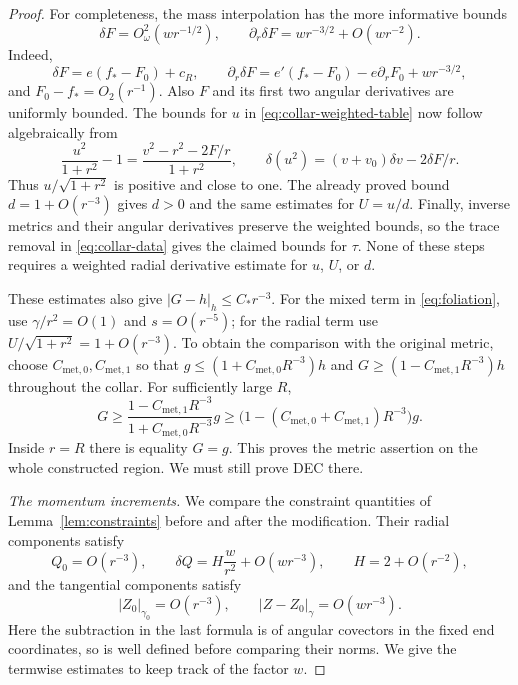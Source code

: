 \begin{proof}
For completeness, the mass interpolation has the more informative
bounds
\begin{equation}\label{eq:collar-mass-difference}
 \delta F=O^2_\omega(wr^{-1/2}),\qquad
 \partial_r\delta F=wr^{-3/2}+O(wr^{-2}).
\end{equation}
Indeed,
\[
 \delta F=e(f_*-F_0)+c_R,\qquad
 \partial_r\delta F=e'(f_*-F_0)-e\partial_rF_0+wr^{-3/2},
\]
and $F_0-f_*=O_2(r^{-1})$.  Also $F$ and its first two angular
derivatives are uniformly bounded.  The bounds for $u$ in
\eqref{eq:collar-weighted-table} now follow algebraically from
\[
 \frac{u^2}{1+r^2}-1
   =\frac{v^2-r^2-2F/r}{1+r^2},\qquad
 \delta(u^2)=(v+v_0)\delta v-2\delta F/r.
\]
Thus $u/\sqrt{1+r^2}$ is positive and close to one.  The already proved
bound $d=1+O(r^{-3})$ gives $d>0$ and the same estimates for $U=u/d$.
Finally, inverse metrics and their angular derivatives preserve the
weighted bounds, so the trace removal in \eqref{eq:collar-data} gives the
claimed bounds for $\tau$.  None of these steps requires a weighted
radial derivative estimate for $u$, $U$, or $d$.

These estimates also give $|G-h|_h\leq C_*r^{-3}$.  For the mixed term in
\eqref{eq:foliation}, use $\gamma/r^2=O(1)$ and $s=O(r^{-5})$; for the
radial term use $U/\sqrt{1+r^2}=1+O(r^{-3})$.
To obtain the comparison with the original metric, choose $C_{\mathrm{met},0},C_{\mathrm{met},1}$
so that $g\leq(1+C_{\mathrm{met},0}R^{-3})h$ and
$G\geq(1-C_{\mathrm{met},1}R^{-3})h$ throughout the collar. For sufficiently large
$R$,
\[
 G\geq\frac{1-C_{\mathrm{met},1}R^{-3}}{1+C_{\mathrm{met},0}R^{-3}}g
   \geq\bigl(1-(C_{\mathrm{met},0}+C_{\mathrm{met},1})R^{-3}\bigr)g.
\]
Inside $r=R$ there is equality $G=g$. This proves the metric assertion
on the whole constructed region. We must still prove DEC there.

\medskip
\noindent\emph{The momentum increments.}
We compare the constraint quantities of Lemma~\ref{lem:constraints}
before and after the modification.  Their radial components satisfy
\begin{equation}\label{eq:collar-momentum-estimates}
 Q_0=O(r^{-3}),\qquad
 \delta Q=H\frac{w}{r^2}+O(wr^{-3}),\qquad H=2+O(r^{-2}),
\end{equation}
and the tangential components satisfy
\begin{equation}\label{eq:collar-transverse-estimates}
 |Z_0|_{\gamma_0}=O(r^{-3}),\qquad
 |Z-Z_0|_\gamma=O(wr^{-3}).
\end{equation}
Here the subtraction in the last formula is of angular covectors in the
fixed end coordinates, so is well defined before comparing their norms.
We give the termwise estimates to keep track of the factor $w$.


\end{proof}
